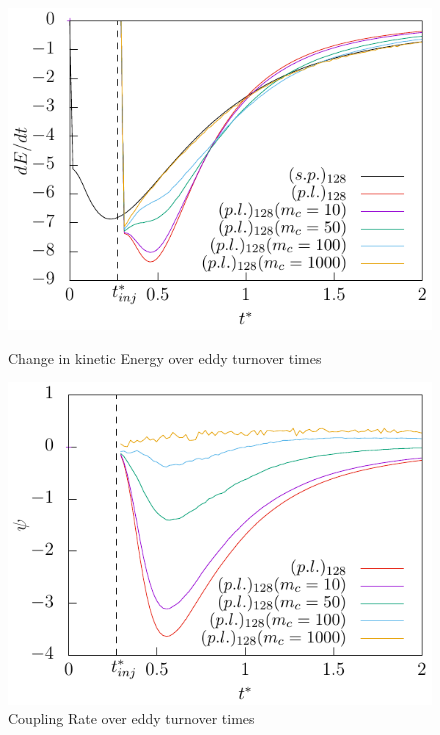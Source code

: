 \documentclass[11pt,a4paper,openany,oneside,parskip=half*]{article}
\begin{document}
\begin{figure}[h]
    \centering
    \begin{minipage}{.5\textwidth}
        \centering
        \includegraphics[width=\linewidth]{./Abbildungen/128/der(kineticEnergy)_time.pdf}
        \caption{Change in kinetic Energy over eddy turnover times}
        \label{der(kineticEnergy)_time_128}
    \end{minipage}%
    \begin{minipage}{0.5\textwidth}
        \centering
        \includegraphics[width=\linewidth]{./Abbildungen/128/coupling_time.pdf}
        \caption{Coupling Rate over eddy turnover times}
        \label{coupling_time_128}
    \end{minipage}
\end{figure}
\end{document}

